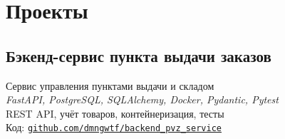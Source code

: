 \documentclass[a4paper,12pt]{article}
\begin{document}
	
	\vspace{10pt}
	
	
	
	
	\section*{Проекты}
	
	\subsection*{Бэкенд-сервис пункта выдачи заказов}
	Сервис управления пунктами выдачи и складом \\
	\textit{FastAPI, PostgreSQL, SQLAlchemy, Docker, Pydantic, Pytest}\\  
	REST API, учёт товаров, контейнеризация, тесты\\
	{Код: \href{https://github.com/dmngwtf/backend_pvz_service}{\texttt{github.com/dmngwtf/backend\_pvz\_service}}}

		
		
	
\end{document}
